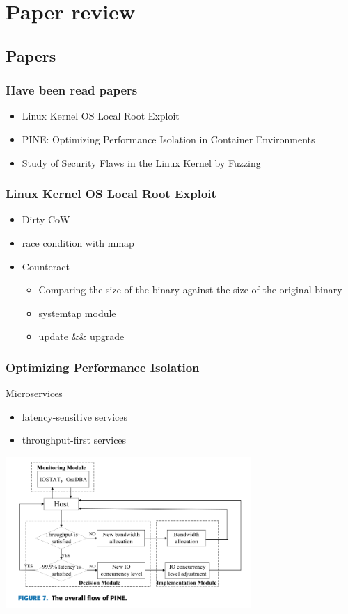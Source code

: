 \documentclass{beamer}
\begin{document}
\section{Paper review}
\subsection{Papers}
\begin{frame}
    \frametitle{Have been read papers}
    \begin{itemize}
        \item Linux Kernel OS Local Root Exploit\cite{root_exploit}
        \item PINE: Optimizing Performance Isolation in Container Environments\cite{Optimizing}
        \item Study of Security Flaws in the Linux Kernel by Fuzzing\cite{Fuzzing}
    \end{itemize}
\end{frame}

\begin{frame}
    \frametitle{Linux Kernel OS Local Root Exploit}
    \begin{itemize}
        \item Dirty CoW
        \item race condition with mmap
        \item Counteract
              \begin{itemize}
                  \item Comparing the size of the binary against the size of the original binary\cite{root_exploit}
                  \item systemtap module
                  \item update \&\& upgrade
              \end{itemize}
    \end{itemize}
\end{frame}

\begin{frame}
    \frametitle{Optimizing Performance Isolation}
    \begin{beamerboxesrounded}{Microservices}
        \begin{itemize}
            \item latency-sensitive services
            \item throughput-first services
        \end{itemize}
        \centering\includegraphics[width=0.7\textwidth]{PINE.png}\cite{Optimizing}
    \end{beamerboxesrounded}
\end{frame}
\end{document}
